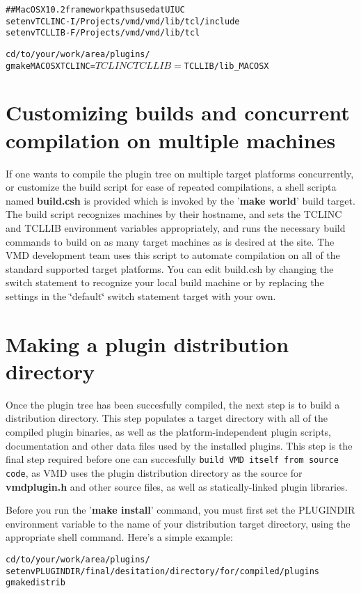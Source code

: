 \small\begin{alltt}
## MacOS X 10.2 framework paths used at UIUC
setenv TCLINC -I/Projects/vmd/vmd/lib/tcl/include
setenv TCLLIB -F/Projects/vmd/vmd/lib/tcl

cd /to/your/work/area/plugins/
gmake MACOSX TCLINC=$TCLINC TCLLIB=$TCLLIB/lib_MACOSX
\end{alltt}\normalsize 


\section{Customizing builds and concurrent compilation on multiple machines}\label{makeworld}
 

 If one wants to compile the plugin tree on multiple target platforms  concurrently, or customize the build script for ease of repeated  compilations, a shell scripta named {\bf build.csh} is provided which is invoked by the '{\bf make world}' build target. The build script recognizes machines by their hostname, and sets the TCLINC and TCLLIB environment variables appropriately, and runs the necessary build commands to build on as many target machines as is desired at the site. The VMD development team uses this script to automate compilation on all of the standard supported target platforms. You can edit build.csh by changing the  switch statement to recognize your local build machine or by replacing the settings in the \char`\"{}default\char`\"{} switch statement target with your own.

\section{Making a plugin distribution directory}\label{makedistrib}
 

 Once the plugin tree has been succesfully compiled, the next step is to build a distribution directory. This step populates a target directory with all of the compiled plugin binaries, as well as the platform-independent plugin scripts, documentation and other data files used by the installed  plugins. This step is the final step required before one can succesfully {\tt build VMD itself from source code},  as VMD uses the plugin distribution  directory as the source for {\bf vmdplugin.h} and other source files, as well as statically-linked plugin libraries. 

 Before you run the '{\bf make install}' command, you must first set the PLUGINDIR environment variable to the name of your distribution  target directory, using the appropriate shell command. Here's a  simple example: \small\begin{alltt}
cd /to/your/work/area/plugins/
setenv PLUGINDIR /final/desitation/directory/for/compiled/plugins
gmake distrib
\end{alltt}\normalsize 




